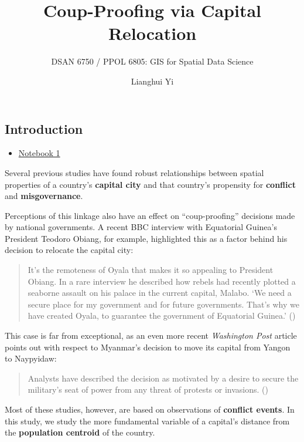 \documentclass[
  letterpaper,
  DIV=11,
  numbers=noendperiod]{scrartcl}
\title{Coup-Proofing via Capital Relocation}
\subtitle{DSAN 6750 / PPOL 6805: GIS for Spatial Data Science}
\author{Lianghui Yi}
\date{}
\providecommand{\tightlist}{%
  \setlength{\itemsep}{0pt}\setlength{\parskip}{0pt}}\usepackage{longtable,booktabs,array}
\begin{document}
\maketitle

\subsection{Introduction}\label{introduction}

\begin{itemize}
\tightlist
\item
  \href{code/bella.get_data-preview.html}{Notebook 1}
\end{itemize}

Several previous studies have found robust relationships between spatial
properties of a country's \textbf{capital city} and that country's
propensity for \textbf{conflict} and \textbf{misgovernance}.

Perceptions of this linkage also have an effect on ``coup-proofing''
decisions made by national governments. A recent BBC interview with
Equatorial Guinea's President Teodoro Obiang, for example, highlighted
this as a factor behind his decision to relocate the capital city:

\begin{quote}
It's the remoteness of Oyala that makes it so appealing to President
Obiang. In a rare interview he described how rebels had recently plotted
a seaborne assault on his palace in the current capital, Malabo. `We
need a secure place for my government and for future governments. That's
why we have created Oyala, to guarantee the government of Equatorial
Guinea.' ()
\end{quote}

This case is far from exceptional, as an even more recent
\emph{Washington Post} article points out with respect to Myanmar's
decision to move its capital from Yangon to Naypyidaw:

\begin{quote}
Analysts have described the decision as motivated by a desire to secure
the military's seat of power from any threat of protests or invasions.
()
\end{quote}

Most of these studies, however, are based on observations of
\textbf{conflict events}. In this study, we study the more fundamental
variable of a capital's distance from the \textbf{population centroid}
of the country.
\end{document}
